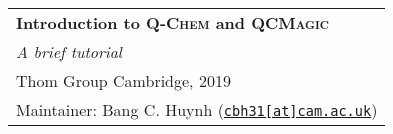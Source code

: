\documentclass[%
	11pt,%
	oneside,%
	DIV=15,%
	BCOR=0mm,%
	headinclude=true,%
	footinclude=true,%
	parskip=half,%
	headsepline
]{scrartcl}
\begin{document}
	\vspace{1cm}
	\noindent
	\bgroup
	\renewcommand\arraystretch{1.5} \begin{tabular*}{\linewidth}{>{\centering\arraybackslash}m{\linewidth}}
		\hline
		\textbf{\Large Introduction to \textsc{Q-Chem} and \textsc{QCMagic}}\\
		\textit{\large A brief tutorial}\\
		\textcopyright Thom Group Cambridge, 2019\\[-8pt]
		Maintainer: Bang C. Huynh (\href{mailto:cbh31@cam.ac.uk}{\texttt{cbh31[at]cam.ac.uk}})\\
		\hline
	\end{tabular*}
	\egroup
	
	\tableofcontents
	
	\clearpage
	
	
\end{document}
